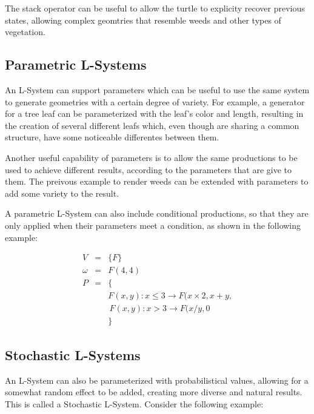 \documentclass{acmtog}
\begin{document}
The stack operator can be useful to allow the turtle to explicity recover previous states, allowing complex geomtries that resemble weeds and other types of vegetation.

\subsection{Parametric L-Systems}
\label{subsec:parametric}

An L-System can support parameters which can be useful to use the same system to generate geometries with a certain degree of variety. For example, a generator for a tree leaf can be parameterized with the leaf's color and length, resulting in the creation of several different leafs which, even though are sharing a common structure, have some noticeable differentes between them.

Another useful capability of parameters is to allow the same productions to be used to achieve different results, according to the parameters that are give to them. The preivous example to render weeds can be extended with parameters to add some variety to the result.

A parametric L-System can also include conditional productions, so that they are only applied when their parameters meet a condition, as shown in the following example:

\begin{eqnarray}
  V       &=& \{F\}                                               \nonumber \\
  \omega  &=& F(4,4)                                              \nonumber \\
  P       &=& \{                                                  \nonumber \\
          & & F(x,y) : x \leq 3 \rightarrow F(x \times 2, x + y,  \nonumber \\
          & & \, F(x,y) : x >    3 \rightarrow F(x / y, 0\        \nonumber \\
          & & \}                                                  \nonumber
\end{eqnarray}

\subsection{Stochastic L-Systems}
\label{subsec:stochastic}

An L-System can also be parameterized with probabilistical values, allowing for a somewhat random effect to be added, creating more diverse and natural results. This is called a Stochastic L-System. Consider the following example:
\end{document}
